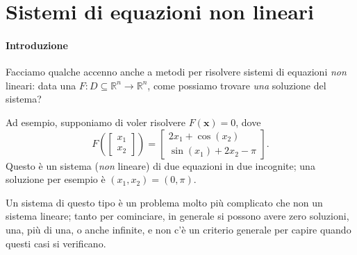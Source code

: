 \documentclass[a4paper]{report}
\theoremstyle{definiton}
\theoremstyle{remark}
\begin{document}


\section{Sistemi di equazioni non lineari}

\paragraph{Introduzione} Facciamo qualche accenno anche a metodi per risolvere sistemi di equazioni \emph{non} lineari: data una $F: D \subseteq \mathbb{R}^n \to \mathbb{R}^n$, come possiamo trovare \emph{una} soluzione del sistema?

Ad esempio, supponiamo di voler risolvere $F(\mathbf{x})=0$, dove
\begin{equation} \label{esempiosistemanonlin}
    F\left(\begin{bmatrix}
        x_1\\ x_2
    \end{bmatrix}\right) = \begin{bmatrix}
        2x_1 + \cos(x_2)\\
        \sin(x_1) + 2x_2 - \pi
    \end{bmatrix}.
\end{equation}
Questo è un sistema (\emph{non} lineare) di due equazioni in due incognite; una soluzione per esempio è $(x_1, x_2) = (0,\pi)$.

Un sistema di questo tipo è un problema molto più complicato che non un sistema lineare; tanto per cominciare, in generale si possono avere zero soluzioni, una, più di una, o anche infinite, e non c'è un criterio generale per capire quando questi casi si verificano.
\end{document}
